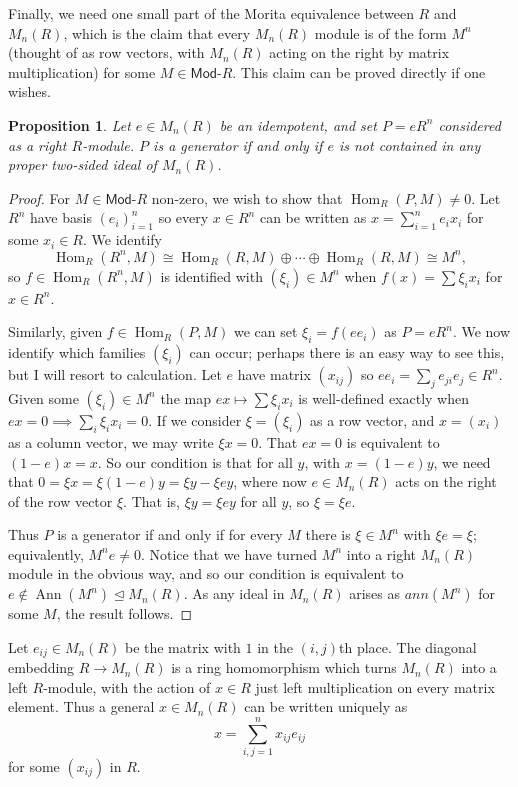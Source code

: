 \documentclass[a4paper,12pt]{article}
\theoremstyle{plain}
\newtheorem{proposition}{Proposition}[section]
\theoremstyle{definition}
\renewcommand{\mod}{\textsf{Mod-}}
\renewcommand{\hom}{\operatorname{Hom}}
\newcommand{\ann}{\operatorname{Ann}}
\begin{document}
Finally, we need one small part of the Morita equivalence between $R$ and $M_n(R)$, which is the claim
that every $M_n(R)$ module is of the form $M^n$ (thought of as row vectors, with $M_n(R)$ acting on the
right by matrix multiplication) for some $M\in \mod R$.  This claim can be proved directly if one wishes.

\begin{proposition}
Let $e\in M_n(R)$ be an idempotent, and set $P = e R^n$ considered as a right $R$-module.  $P$ is
a generator if and only if $e$ is not contained in any proper two-sided ideal of $M_n(R)$.
\end{proposition}
\begin{proof}
For $M\in\mod R$ non-zero, we wish to show that $\hom_R(P,M)\not=0$.  Let $R^n$ have basis $(e_i)_{i=1}^n$
so every $x\in R^n$ can be written as $x = \sum_{i=1}^n e_i x_i$ for some $x_i\in R$.
We identify
\[ \hom_R(R^n,M) \cong \hom_R(R,M) \oplus \cdots \oplus \hom_R(R,M) \cong M^n, \]
so $f\in \hom_R(R^n,M)$ is identified with $(\xi_i)\in M^n$ when $f(x) = \sum \xi_i x_i$ for $x\in R^n$.

Similarly, given $f\in \hom_R(P,M)$ we can set $\xi_i = f(e e_i)$ as $P=eR^n$.  We now identify which
families $(\xi_i)$ can occur; perhaps there is an easy way to see this, but I will resort to calculation.
Let $e$ have matrix $(x_{ij})$ so $ee_i = \sum_j e_{ji} e_j \in R^n$.  Given some $(\xi_i)\in M^n$ the map
$ex \mapsto \sum \xi_i x_i$ is well-defined exactly when $ex=0 \implies \sum_i \xi_i x_i=0$.  If we consider
$\xi = (\xi_i)$ as a row vector, and $x=(x_i)$ as a column vector, we may write $\xi x = 0$.  That $ex=0$ is
equivalent to $(1-e)x=x$.  So our condition is that for all $y$, with $x = (1-e)y$, we need that
$0 = \xi x = \xi(1-e)y = \xi y - \xi e y$, where now $e\in M_n(R)$ acts on the right of the row vector $\xi$.
That is, $\xi y =\xi e y$ for all $y$, so $\xi = \xi e$.

Thus $P$ is a generator if and only if for every $M$ there is $\xi\in M^n$ with $\xi e = \xi$; equivalently,
$M^n e \not= 0$.  Notice that we have turned $M^n$ into a right $M_n(R)$ module in the obvious way, and so
our condition is equivalent to $e\not\in\ann(M^n) \trianglelefteq M_n(R)$.  As any ideal in $M_n(R)$ arises 
as $ann(M^n)$ for some $M$, the result follows.
\end{proof}

Let $e_{ij}\in M_n(R)$ be the matrix with $1$ in the $(i,j)$th place.  The diagonal embedding $R\rightarrow M_n(R)$ 
is a ring homomorphism which turns $M_n(R)$ into a left $R$-module, with the action of $x\in R$ just left 
multiplication on every matrix element.  Thus a general $x\in M_n(R)$ can be written uniquely as
\[ x = \sum_{i,j=1}^n x_{ij} e_{ij} \]
for some $(x_{ij})$ in $R$.
\end{document}
